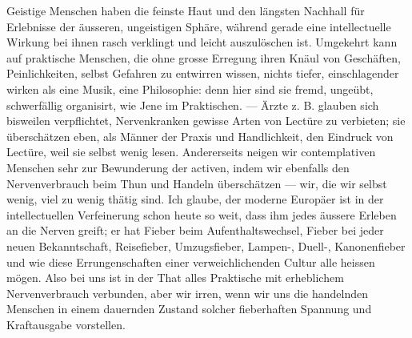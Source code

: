 Geistige Menschen haben die feinste Haut und den längsten Nachhall für Erlebnisse der äusseren, ungeistigen Sphäre, während gerade eine intellectuelle Wirkung bei ihnen rasch verklingt und leicht auszulöschen ist. Umgekehrt kann auf praktische Menschen, die ohne grosse Erregung ihren Knäul von Geschäften, Peinlichkeiten, selbst Gefahren zu entwirren wissen, nichts tiefer, einschlagender wirken als eine Musik, eine Philosophie: denn hier sind sie fremd, ungeübt, schwerfällig organisirt, wie Jene im Praktischen. — Ärzte z. B. glauben sich bisweilen verpflichtet, Nervenkranken gewisse Arten von Lectüre zu verbieten; sie überschätzen eben, als Männer der Praxis und Handlichkeit, den Eindruck von Lectüre, weil sie selbst wenig lesen. Andererseits neigen wir contemplativen Menschen sehr zur Bewunderung der activen, indem wir ebenfalls den Nervenverbrauch beim Thun und Handeln überschätzen — wir, die wir selbst wenig, viel zu wenig thätig sind. Ich glaube, der moderne Europäer ist in der intellectuellen Verfeinerung schon heute so weit, dass ihm jedes äussere Erleben an die Nerven greift; er hat Fieber beim Aufenthaltswechsel, Fieber bei jeder neuen Bekanntschaft, Reisefieber, Umzugsfieber, Lampen-, Duell-, Kanonenfieber und wie diese Errungenschaften einer verweichlichenden Cultur alle heissen mögen. Also bei uns ist in der That alles Praktische mit erheblichem Nervenverbrauch verbunden, aber wir irren, wenn wir uns die handelnden Menschen in einem dauernden Zustand solcher fieberhaften Spannung und Kraftausgabe vorstellen.
\par

